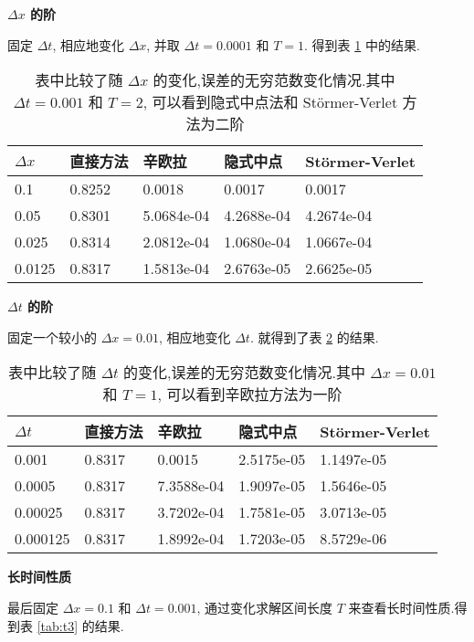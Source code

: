 \textbf{$\Delta x$ 的阶}

固定 $\Delta t$, 相应地变化 $\Delta x$, 并取
$\Delta t = 0.0001$ 和 $T = 1$. 得到表 \ref{tab:dx3} 中的结果.

\begin{table}[h!]
  \centering
\caption{表中比较了随 $\Delta x$ 的变化,误差的无穷范数变化情况.其中 $\Delta t=0.001$ 和 $T=2$, 可以看到隐式中点法和 St\"{o}rmer-Verlet 方法为二阶}
\begin{tabularx}{\linewidth}{XXXXX}
 \toprule[1.5pt]
 $\Delta x$ &直接方法 & 辛欧拉 & 隐式中点 & St\"{o}rmer-Verlet\\
 \midrule[1pt]
 0.1 & 0.8252 & 0.0018 & 0.0017 & 0.0017\\
 0.05 & 0.8301 & 5.0684e-04 & 4.2688e-04 & 4.2674e-04\\
 0.025 & 0.8314 & 2.0812e-04 & 1.0680e-04 & 1.0667e-04\\
 0.0125 & 0.8317 & 1.5813e-04 & 2.6763e-05 & 2.6625e-05\\
 \bottomrule[1.5pt]
\end{tabularx}
  \label{tab:dx3}
\end{table}

\textbf{$\Delta t$ 的阶}

固定一个较小的 $\Delta x = 0.01$, 相应地变化 $\Delta t$. 就得到了表 \ref{tab:dt3} 的结果.

\begin{table}[h]
  \centering
\caption{表中比较了随 $\Delta t$ 的变化,误差的无穷范数变化情况.其中 $\Delta x=0.01$ 和 $T=1$, 可以看到辛欧拉方法为一阶}
\begin{tabularx}{\linewidth}{XXXXX}
 \toprule[1.5pt]
 $\Delta t$ &直接方法 & 辛欧拉 & 隐式中点 & St\"{o}rmer-Verlet\\
 \midrule[1pt]
 0.001 & 0.8317 & 0.0015 & 2.5175e-05 & 1.1497e-05 \\
 0.0005 & 0.8317 & 7.3588e-04 & 1.9097e-05 & 1.5646e-05 \\
 0.00025 & 0.8317 & 3.7202e-04 & 1.7581e-05 & 3.0713e-05 \\
 0.000125 & 0.8317 & 1.8992e-04 & 1.7203e-05 & 8.5729e-06 \\
 \bottomrule[1.5pt]
\end{tabularx}
  \label{tab:dt3}
\end{table}

\textbf{长时间性质}

最后固定 $\Delta x = 0.1$ 和 $\Delta t = 0.001$, 通过变化求解区间长度 $T$ 来查看长时间性质.得到表 \ref{tab:t3} 的结果.

